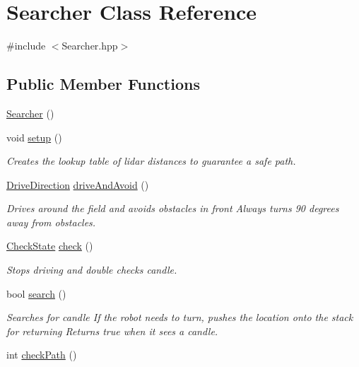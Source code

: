 \hypertarget{classSearcher}{\section{Searcher Class Reference}
\label{classSearcher}
}


{\ttfamily \#include $<$Searcher.\-hpp$>$}

\subsection*{Public Member Functions}
\begin{DoxyCompactItemize}
\item 
\hyperlink{classSearcher_a46e9a9fa3aad21131cf6bd25237e3a80}{Searcher} ()
\item 
void \hyperlink{classSearcher_a8de47195c81aefbc9e2c3f9bf3a082fa}{setup} ()
\begin{DoxyCompactList}\small\item\em Creates the lookup table of lidar distances to guarantee a safe path. \end{DoxyCompactList}\item 
\hyperlink{DriveMotor_8hpp_a077d9d13989efa3142086ea83cbb1e68}{Drive\-Direction} \hyperlink{classSearcher_ae2933c43728ef6783d0e793cb23ab5f6}{drive\-And\-Avoid} ()
\begin{DoxyCompactList}\small\item\em Drives around the field and avoids obstacles in front Always turns 90 degrees away from obstacles. \end{DoxyCompactList}\item 
\hyperlink{classSearcher_a2c16b7eb56e090a7b832da7f2c9d5e9c}{Check\-State} \hyperlink{classSearcher_ad730a64dfa33bd178841c8bad64bc27a}{check} ()
\begin{DoxyCompactList}\small\item\em Stops driving and double checks candle. \end{DoxyCompactList}\item 
bool \hyperlink{classSearcher_ac568e6ce4cd7ca5c0b9283ab240e6537}{search} ()
\begin{DoxyCompactList}\small\item\em Searches for candle If the robot needs to turn, pushes the location onto the stack for returning Returns true when it sees a candle. \end{DoxyCompactList}\item 
int \hyperlink{classSearcher_ac541c9bafe6431e5fbf5b7e9c754b56a}{check\-Path} ()

\end{DoxyCompactItemize}
